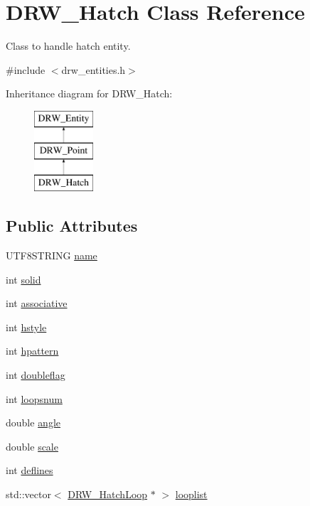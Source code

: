 \hypertarget{class_d_r_w___hatch}{}\section{D\+R\+W\+\_\+\+Hatch Class Reference}
\label{class_d_r_w___hatch}


Class to handle hatch entity.  




{\ttfamily \#include $<$drw\+\_\+entities.\+h$>$}

Inheritance diagram for D\+R\+W\+\_\+\+Hatch\+:\begin{figure}[H]
\begin{center}
\leavevmode
\includegraphics[height=3.000000cm]{d1/d3e/class_d_r_w___hatch}
\end{center}
\end{figure}
\subsection*{Public Attributes}
\begin{DoxyCompactItemize}
\item 
U\+T\+F8\+S\+T\+R\+I\+N\+G \hyperlink{class_d_r_w___hatch_a3e864b79a0757b7ab2a8c32a21165150}{name}
\item 
int \hyperlink{class_d_r_w___hatch_a4eec0fc3cd839a3892e875bcc9789d48}{solid}
\item 
int \hyperlink{class_d_r_w___hatch_af152cba96e8bd0471aafd2764defe458}{associative}
\item 
int \hyperlink{class_d_r_w___hatch_a7b8950911e5fb319f0d63b7ee2251f87}{hstyle}
\item 
int \hyperlink{class_d_r_w___hatch_abb23290d594b69e7b9c18ece2de7ec8e}{hpattern}
\item 
int \hyperlink{class_d_r_w___hatch_a06da8a64445bd9e5c159dab4243c992a}{doubleflag}
\item 
int \hyperlink{class_d_r_w___hatch_a52ba4f38bba83fe735cb14447e256260}{loopsnum}
\item 
double \hyperlink{class_d_r_w___hatch_aee22d8d574a33e852ad82c345899b886}{angle}
\item 
double \hyperlink{class_d_r_w___hatch_a0ee3311f6d41385488af2cafd55cd7ef}{scale}
\item 
int \hyperlink{class_d_r_w___hatch_a15bd241e3c34d82c35db31470fe25741}{deflines}
\item 
std\+::vector$<$ \hyperlink{class_d_r_w___hatch_loop}{D\+R\+W\+\_\+\+Hatch\+Loop} $\ast$ $>$ \hyperlink{class_d_r_w___hatch_a258a13a2da31ae31fd22e2da3757da5c}{looplist}
\end{DoxyCompactItemize}
